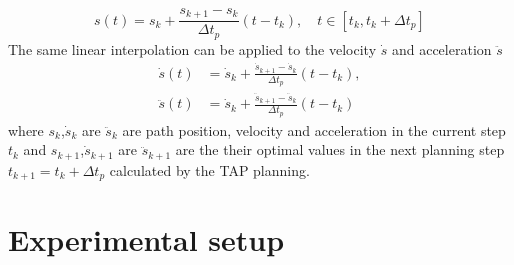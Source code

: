 \begin{equation}
    s(t) = s_k + \frac{s_{k+1}-s_k}{\Delta t_p}(t - t_k), \quad t \in \left[t_k, t_k + \Delta t_p\right]
\end{equation}
The same linear interpolation can be applied to the velocity $\dot{s}$ and acceleration $\ddot{s}$
\begin{equation}
\begin{split}
    \dot{s}(t) &= \dot{s}_k + \frac{\dot{s}_{k+1} - \dot{s}_{k}}{\Delta t_p}(t - t_k),\\
    \ddot{s}(t) &= \dot{s}_k + \frac{\ddot{s}_{k+1} - \ddot{s}_{k}}{\Delta t_p}(t - t_k)
\end{split}
\end{equation}
where $s_k$,$\dot{s}_k$ are $\ddot{s}_k$ are path position, velocity and acceleration in the current step $t_k$ and  $s_{k+1}$,$\dot{s}_{k+1}$ are $\ddot{s}_{k+1}$ are the their optimal values in the next planning step $t_{k+1}=t_k + \Delta t_p$ calculated by the TAP planning. 









\section{Experimental setup}
\label{ch:setup}


